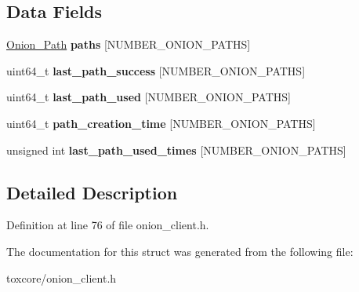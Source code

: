 \subsection*{Data Fields}
\begin{DoxyCompactItemize}
\item 
\hypertarget{struct_onion___client___paths_afaa8c1f23d89bd5acee1f956e8872061}{\hyperlink{struct_onion___path}{Onion\+\_\+\+Path} {\bfseries paths} \mbox{[}N\+U\+M\+B\+E\+R\+\_\+\+O\+N\+I\+O\+N\+\_\+\+P\+A\+T\+H\+S\mbox{]}}\label{struct_onion___client___paths_afaa8c1f23d89bd5acee1f956e8872061}

\item 
\hypertarget{struct_onion___client___paths_afbee813e09086f6993c94cdaafe2ae36}{uint64\+\_\+t {\bfseries last\+\_\+path\+\_\+success} \mbox{[}N\+U\+M\+B\+E\+R\+\_\+\+O\+N\+I\+O\+N\+\_\+\+P\+A\+T\+H\+S\mbox{]}}\label{struct_onion___client___paths_afbee813e09086f6993c94cdaafe2ae36}

\item 
\hypertarget{struct_onion___client___paths_a3e3d1429ce10f2adad7b1c02df8f5417}{uint64\+\_\+t {\bfseries last\+\_\+path\+\_\+used} \mbox{[}N\+U\+M\+B\+E\+R\+\_\+\+O\+N\+I\+O\+N\+\_\+\+P\+A\+T\+H\+S\mbox{]}}\label{struct_onion___client___paths_a3e3d1429ce10f2adad7b1c02df8f5417}

\item 
\hypertarget{struct_onion___client___paths_abc272861ece76f9d9bac356f7297ce3e}{uint64\+\_\+t {\bfseries path\+\_\+creation\+\_\+time} \mbox{[}N\+U\+M\+B\+E\+R\+\_\+\+O\+N\+I\+O\+N\+\_\+\+P\+A\+T\+H\+S\mbox{]}}\label{struct_onion___client___paths_abc272861ece76f9d9bac356f7297ce3e}

\item 
\hypertarget{struct_onion___client___paths_a3a947792d864563f1c4d6984cc9c638a}{unsigned int {\bfseries last\+\_\+path\+\_\+used\+\_\+times} \mbox{[}N\+U\+M\+B\+E\+R\+\_\+\+O\+N\+I\+O\+N\+\_\+\+P\+A\+T\+H\+S\mbox{]}}\label{struct_onion___client___paths_a3a947792d864563f1c4d6984cc9c638a}

\end{DoxyCompactItemize}


\subsection{Detailed Description}


Definition at line 76 of file onion\+\_\+client.\+h.



The documentation for this struct was generated from the following file\+:\begin{DoxyCompactItemize}
\item 
toxcore/onion\+\_\+client.\+h\end{DoxyCompactItemize}
